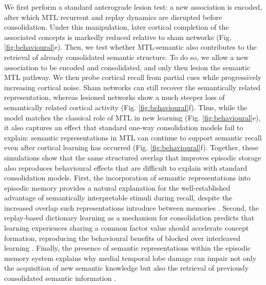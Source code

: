 \documentclass{article}
\begin{document}
We first perform a standard anterograde lesion test: a new association is encoded, after which MTL recurrent and replay dynamics are disrupted before consolidation. Under this manipulation, later cortical completion of the associated concepts is markedly reduced relative to sham networks (Fig. \ref{fig:behavioural}e). Then, we test whether MTL-semantic also contributes to the retrieval of already consolidated semantic structure. To do so, we allow a new association to be encoded and consolidated, and only then lesion the semantic MTL pathway. We then probe cortical recall from partial cues while progressively increasing cortical noise. Sham networks can still recover the semantically related representation, whereas lesioned networks show a much steeper loss of semantically related cortical activity (Fig. \ref{fig:behavioural}f). Thus, while the model matches the classical role of MTL in new learning (Fig. \ref{fig:behavioural}e), it also captures an effect that standard one-way consolidation models fail to explain: semantic representations in MTL can continue to support semantic recall even after cortical learning has occurred (Fig. \ref{fig:behavioural}f).
\newline\newline
Together, these simulations show that the same structured overlap that improves episodic storage also reproduces behavioural effects that are difficult to explain with standard consolidation models. First, the incorporation of semantic representations into episodic memory provides a natural explanation for the well-established advantage of semantically interpretable stimuli during recall, despite the increased overlap such representations introduce between memories . Second, the replay-based dictionary learning as a mechanism for consolidation predicts that learning experiences sharing a common factor value should accelerate concept formation, reproducing the behavioural benefits of blocked over interleaved learning . Finally, the presence of semantic representations within the episodic memory system explains why medial temporal lobe damage can impair not only the acquisition of new semantic knowledge but also the retrieval of previously consolidated semantic information .
\end{document}
